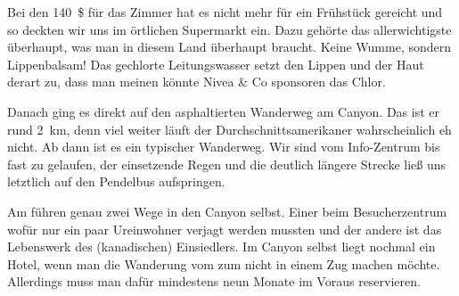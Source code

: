 Bei den 140~\$ für das Zimmer hat es nicht mehr für ein Frühstück gereicht und so deckten wir uns im ört\-lichen Supermarkt ein.
Dazu gehörte das allerwichtigste über\-haupt, was man in diesem Land überhaupt braucht.
Keine Wumme, sondern Lippenbalsam!
Das gechlorte Leitungswasser setzt den Lippen und der Haut derart zu, dass man meinen könnte Nivea \& Co sponsoren das Chlor.\\

\newpage

\vspace*{.4\paperheight}

Danach ging es direkt auf den asphaltierten Wanderweg am Canyon.
Das ist er rund 2~km, denn viel weiter läuft der Durchschnittsamerikaner wahrscheinlich eh nicht.
Ab dann ist es ein typischer Wanderweg.
Wir sind vom Info-Zentrum bis fast zu  gelaufen, der einsetzende Regen und die deutlich längere Strecke ließ uns letztlich auf den Pendelbus aufspringen.

\newpage


\vspace*{.4\paperheight}

Am  führen genau zwei Wege in den Canyon selbst.
Einer beim Besucherzentrum wofür nur ein paar Ureinwohner verjagt werden mussten und der andere ist das Lebenswerk des (kanadischen) Einsiedlers.
Im Canyon selbst liegt nochmal ein Hotel, wenn man die Wanderung vom  zum  nicht in einem Zug machen möchte.
Allerdings muss man dafür mindestens neun Monate im Voraus reservieren.

